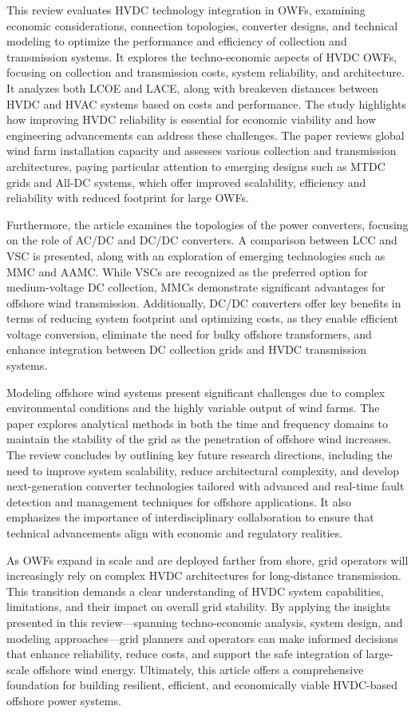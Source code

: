 \documentclass{ieeeaccess}
\begin{document}
This review evaluates HVDC technology integration in OWFs, examining economic considerations, connection topologies, converter designs, and technical modeling to optimize the performance and efficiency of collection and transmission systems. It explores the {techno-economic aspects of HVDC OWFs}, focusing on collection and transmission costs, system reliability, and architecture. It analyzes both LCOE and LACE, along with breakeven distances between HVDC and HVAC systems based on costs and performance. The study highlights how improving HVDC reliability is essential for economic viability and how engineering advancements can address these challenges. The paper reviews global wind farm installation capacity and assesses various collection and transmission architectures, paying particular attention to emerging designs such as {MTDC grids} and {All-DC systems}, which offer improved scalability, efficiency and reliability with reduced footprint for large OWFs.

Furthermore, the article examines the topologies of the power converters, focusing on the role of {AC/DC and DC/DC converters}. A comparison between LCC and VSC is presented, along with an exploration of emerging technologies such as MMC and AAMC. While VSCs are recognized as the preferred option for medium-voltage DC collection, MMCs demonstrate significant advantages for offshore wind transmission. Additionally, DC/DC converters offer key benefits in terms of reducing system footprint and optimizing costs, as they enable efficient voltage conversion, eliminate the need for bulky offshore transformers, and enhance integration between DC collection grids and HVDC transmission systems.


Modeling offshore wind systems present significant challenges due to complex environmental conditions and the highly variable output of wind farms. The paper explores analytical methods in both the time and frequency domains to maintain the stability of the grid as the penetration of offshore wind increases.
The review concludes by outlining key future research directions, including the need to improve system scalability, reduce architectural complexity, and develop next-generation converter technologies tailored with advanced and real-time fault detection and management techniques for offshore applications. It also emphasizes the importance of interdisciplinary collaboration to ensure that technical advancements align with economic and regulatory realities. 

As OWFs expand in scale and are deployed farther from shore, grid operators will increasingly rely on complex HVDC architectures for long-distance transmission. This transition demands a clear understanding of HVDC system capabilities, limitations, and their impact on overall grid stability. By applying the insights presented in this review—spanning techno-economic analysis, system design, and modeling approaches—grid planners and operators can make informed decisions that enhance reliability, reduce costs, and support the safe integration of large-scale offshore wind energy. Ultimately, this article offers a comprehensive foundation for building resilient, efficient, and economically viable HVDC-based offshore power systems.
\end{document}
